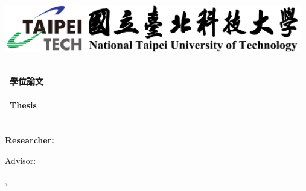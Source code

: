 \begin{titlepage}
    \newpage
    \begin{center}
        \includegraphics[width=13cm]{ntut-logo-with-label-eng.jpg}

        \huge\bf\deptCname\\%
        \huge\bf\degreeCname ~學位論文\\ %
        \LARGE\bf\fulldeptEname \\%
        \LARGE\bf\degreeEname ~Thesis\\ %

        \vfill
        \huge\bf\cTitle\\ %
        \LARGE\bf\eTitle\\ %

        \vfill
        {\Large Researcher: \myEname}

        \vfill
        {\Large Advisor: \advisorEname}

        \vfill
        {\Large \eMonth, \eYear}
    \end{center}
\end{titlepage}